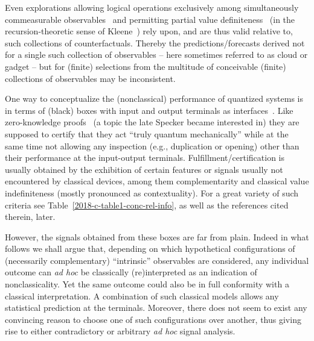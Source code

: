 \documentclass[%
  reprint,
  twocolumn,
 showpacs,
 showkeys,
 preprintnumbers,
 amsmath,amssymb,
 aps,
  prl,
  longbibliography,
 ]{revtex4-1}
\begin{document}
Even explorations allowing logical operations exclusively among simultaneously commeasurable observables~\cite{kochen2,kochen3}
and permitting partial value definiteness~\cite{2012-incomput-proofsCJ,2015-AnalyticKS}
(in the recursion-theoretic sense of Kleene~\cite{Kleene1936})
rely upon, and are thus valid relative to, such collections of counterfactuals.
Thereby the predictions/forecasts
derived not for a single such collection of observables
-- here sometimes referred to as cloud or gadget --
but for (finite) selections from the multitude of conceivable (finite) collections of observables
may be inconsistent.


One way to conceptualize the (nonclassical) performance of quantized systems is in terms of (black) boxes
with input and output terminals as interfaces~\cite{2018-minimalYIYS}.
Like zero-knowledge proofs~\cite{Quisquater1990} (a topic the late Specker became interested in)
they are supposed to certify that they act ``truly quantum mechanically''
while at the same time not allowing any inspection (e.g., duplication or opening)
other than their performance at the input-output
terminals.
Fulfillment/certification is usually obtained by the exhibition of certain features or signals usually not encountered by classical devices, among them complementarity
and classical value indefiniteness (mostly pronounced as contextuality).
For a great variety of such criteria see Table~\ref{2018-c-table1-conc-rel-info},
as well as the references cited therein, later.

However, the signals obtained from these boxes are far from plain.
Indeed in what follows we shall argue that,
depending on which hypothetical configurations of (necessarily complementary) ``intrinsic'' observables are
considered, any individual outcome can {\it ad hoc} be classically (re)interpreted as an indication of nonclassicality.
Yet the same outcome could also be in full conformity with a classical interpretation.
A combination of such classical models allows any statistical prediction at the terminals.
Moreover,
there does not seem to exist any convincing reason to choose one
of such configurations over another, thus giving rise to either contradictory or arbitrary {\it ad hoc} signal analysis.
\end{document}
